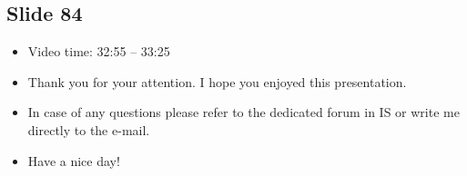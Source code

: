\documentclass[12pt, a4paper]{article}
\begin{document}
	\subsection{Slide 84}
	\begin{itemize}
		\item Video time: 32:55 -- 33:25
		\item Thank you for your attention. I hope you enjoyed this presentation.
		\item In case of any questions please refer to the dedicated forum in IS or write me directly to the e-mail.
		\item Have a nice day!
	\end{itemize}
\end{document}
